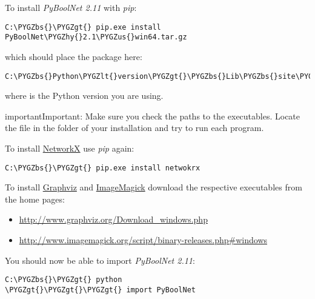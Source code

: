 \documentclass[letterpaper,10pt,english]{sphinxmanual}
\def\PYGZbs{\char`\\}
\def\PYGZus{\char`\_}
\def\PYGZlt{\char`\<}
\def\PYGZgt{\char`\>}
\def\PYGZhy{\char`\-}
\begin{document}
To install \emph{PyBoolNet 2.11} with \emph{pip}:

\begin{Verbatim}[commandchars=\\\{\}]
C:\PYGZbs{}\PYGZgt{} pip.exe install PyBoolNet\PYGZhy{}2.1\PYGZus{}win64.tar.gz
\end{Verbatim}

which should place the package here:

\begin{Verbatim}[commandchars=\\\{\}]
C:\PYGZbs{}Python\PYGZlt{}version\PYGZgt{}\PYGZbs{}Lib\PYGZbs{}site\PYGZhy{}packages
\end{Verbatim}

where  is the Python version you are using.

\begin{notice}{important}{Important:}
Make sure you check the paths to the executables. Locate the file  in the  folder of your installation and
try to run each program.
\end{notice}

To install \href{https://networkx.github.io/}{NetworkX} use \emph{pip} again:

\begin{Verbatim}[commandchars=\\\{\}]
C:\PYGZbs{}\PYGZgt{} pip.exe install netwokrx
\end{Verbatim}

To install \href{http://www.graphviz.org/}{Graphviz} and \href{http://www.imagemagick.org/script/index.php}{ImageMagick} download the respective executables from the home pages:
\begin{itemize}
\item {} 
\href{http://www.graphviz.org/Download\_windows.php}{http://www.graphviz.org/Download\_windows.php}

\item {} 
\href{http://www.imagemagick.org/script/binary-releases.php\#windows}{http://www.imagemagick.org/script/binary-releases.php\#windows}

\end{itemize}

You should now be able to import \emph{PyBoolNet 2.11}:

\begin{Verbatim}[commandchars=\\\{\}]
C:\PYGZbs{}\PYGZgt{} python
\PYGZgt{}\PYGZgt{}\PYGZgt{} import PyBoolNet
\end{Verbatim}
\end{document}
